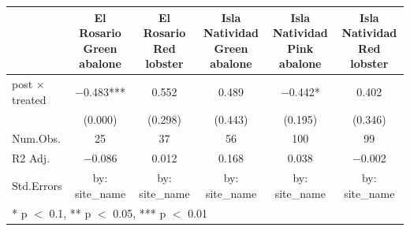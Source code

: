 \begin{table}
\centering
\begin{tabular}[t]{lccccc}
\toprule
  & El Rosario Green abalone & El Rosario Red lobster & Isla Natividad Green abalone & Isla Natividad Pink abalone & Isla Natividad Red lobster\\
\midrule
post × treated & \num{-0.483}*** & \num{0.552} & \num{0.489} & \num{-0.442}* & \num{0.402}\\
 & (\num{0.000}) & (\num{0.298}) & (\num{0.443}) & (\num{0.195}) & (\num{0.346})\\
\midrule
Num.Obs. & \num{25} & \num{37} & \num{56} & \num{100} & \num{99}\\
R2 Adj. & \num{-0.086} & \num{0.012} & \num{0.168} & \num{0.038} & \num{-0.002}\\
Std.Errors & by: site\_name & by: site\_name & by: site\_name & by: site\_name & by: site\_name\\
\bottomrule
\multicolumn{6}{l}{\rule{0pt}{1em}* p $<$ 0.1, ** p $<$ 0.05, *** p $<$ 0.01}\\
\end{tabular}
\end{table}
